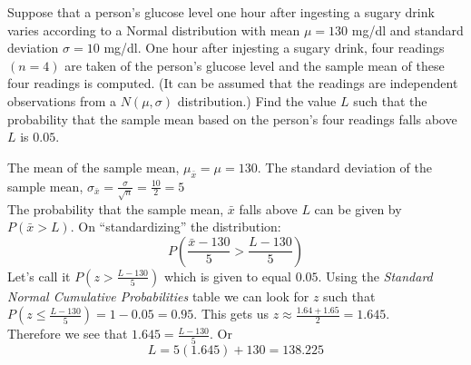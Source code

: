 \documentclass[boxes, qed]{homework}
\begin{document}
\begin{problem}Suppose that a person’s glucose level one hour after 
  ingesting a sugary drink varies according to a Normal distribution 
  with mean $\mu=130$ mg/dl and standard deviation $\sigma=10$ mg/dl. 
  One hour after injesting a sugary drink, four readings $(n=4)$ are taken of 
  the person’s glucose level and the sample mean of these four readings 
  is computed. (It can be assumed that the readings are independent observations from
  a $N(\mu,\sigma)$ distribution.) Find the value $L$ such that the 
  probability that the sample mean based on the person’s four readings
  falls above $L$ is $0.05$.
\end{problem}
\begin{solution}The mean of the sample mean, $\mu_{\bar{x}}=\mu=130$.
  The standard deviation of the sample mean, 
  $\sigma_{\bar{x}}=\frac{\sigma}{\sqrt{n}}=\frac{10}{2}=5$\\

  The probability that the sample mean, $\bar{x}$ falls above $L$
  can be given by $P(\bar{x}>L)$. On ``standardizing'' the distribution:
  $$P(\frac{\bar{x}-130}{5}>\frac{L-130}{5})$$
  Let's call it $P(z>\frac{L-130}{5})$ which is given to equal $0.05$.
  Using the \textit{Standard Normal Cumulative Probabilities} table
  we can look for $z$ such that $P(z\le\frac{L-130}{5})=1-0.05=0.95$. 
  This gets us $z\approx\frac{1.64+1.65}{2}=1.645$.\\

  Therefore we see that $1.645={\frac{L-130}{5}}$. Or
  $$L={5(1.645)+130=\boxed{138.225}}$$
\end{solution}
\end{document}
